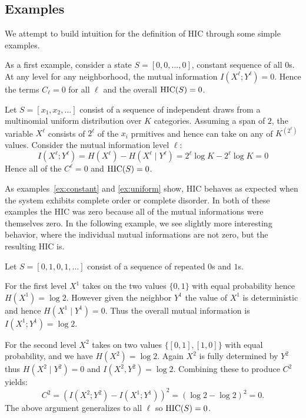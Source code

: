 \subsection{Examples}

We attempt to build intuition for the definition of HIC through some simple
examples.

\begin{example}
  \label{ex:constant}
  As a first example, consider a state $S = [0, 0, \ldots, 0]$,
  constant sequence of all $0$s. At any level for any neighborhood, the mutual
  information $I(X^\ell; Y^\ell) = 0$. Hence the terms $C_\ell = 0$ for all
  $\ell$ and the overall $\textrm{HIC}(S) = 0$.
\end{example}

\begin{example}
  \label{ex:uniform}
  Let $S = [x_1, x_2, \ldots]$ consist of a sequence of independent draws from a
  multinomial uniform distribution over $K$ categories. Assuming a span of $2$,
  the variable $X^\ell$ consists of $2^\ell$ of the $x_i$ prmitives and hence
  can take on any of $K^(2^\ell)$ values. Consider the mutual information level
  $\ell$:
  \begin{equation}
    I(X^\ell; Y^\ell) = H(X^\ell) - H(X^\ell \mid Y^{\ell}) = 2^\ell \log K - 2^\ell \log K = 0
  \end{equation}
  Hence all of the $C^\ell = 0$ and $\textrm{HIC}(S) = 0$.
\end{example}

As examples~\ref{ex:constant} and \ref{ex:uniform} show, HIC behaves as
expected when the system exhibits complete order or complete disorder. In both
of these examples the HIC was zero because all of the mutual informations were
themselves zero. In the following example, we see slightly more interesting
behavior, where the individual mutual informations are not zero, but the
resulting HIC is.

\begin{example}
  \label{ex:repeats}
  Let $S = [0, 1, 0, 1, \ldots]$ consist of a sequence of repeated $0$s and $1$s.

  For the first level $X^1$ takes on the two values $\{0, 1\}$ with equal
  probability hence $H(X^1) = \log 2$. However given the neighbor $Y^1$ the
  value of $X^1$ is deterministic and hence $H(X^1 \mid Y^1) = 0$. Thus the
  overall mutual information is $I(X^1; Y^1) = \log 2$.

  For the second level $X^2$ takes on two values $\{[0, 1], [1, 0]\}$ with
  equal probability, and we have $H(X^2) = \log 2$. Again $X^2$ is fully
  determined by $Y^2$ thus $H(X^2 \mid Y^2) = 0$ and $I(X^2, Y^2) = \log 2$.
  Combining these to produce $C^2$ yields:
  \begin{equation}
    C^2 = (I(X^2; Y^2) - I(X^1; Y^1))^2 = (\log 2 - \log 2)^2 = 0.
  \end{equation}
  The above argument generalizes to all $\ell$ so $\textrm{HIC}(S) = 0$.
\end{example}

